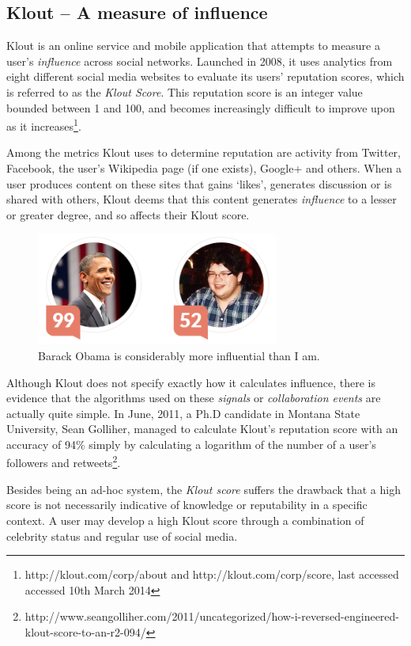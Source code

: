 \documentclass[]{final_report}
\begin{document}
\subsection{Klout -- A measure of influence}

Klout is an online service and mobile application that attempts to measure a user's \textsl{influence} across social networks. Launched in 2008, it uses analytics from eight different social media websites to evaluate its users' reputation scores, which is referred to as the \textsl{Klout Score}. This reputation score is an integer value bounded between 1 and 100, and becomes increasingly difficult to improve upon as it increases\footnote{http://klout.com/corp/about and http://klout.com/corp/score, last accessed accessed 10th March 2014}.

Among the metrics Klout uses to determine reputation are activity from Twitter, Facebook, the user's Wikipedia page (if one exists), Google+ and others. When a user produces content on these sites that gains `likes', generates discussion or is shared with others, Klout deems that this content generates \textsl{influence} to a lesser or greater degree, and so affects their Klout score.

\begin{figure}[ht!]
\centering
\includegraphics[width=80mm]{chap2/klout.png}
\caption{Barack Obama is considerably more influential than I am.}
\end{figure}\label{gra:klout}

Although Klout does not specify exactly how it calculates influence, there is evidence that the algorithms used on these \textsl{signals} or \textsl{collaboration events} are actually quite simple. In June, 2011, a Ph.D candidate in Montana State University, Sean Golliher, managed to calculate Klout's reputation score with an accuracy of 94\% simply by calculating a logarithm of the number of a user's followers and retweets\footnote{http://www.seangolliher.com/2011/uncategorized/how-i-reversed-engineered-klout-score-to-an-r2-094/}.

Besides being an ad-hoc system, the \textsl{Klout score} suffers the drawback that a high score is not necessarily indicative of knowledge or reputability in a specific context. A user may develop a high Klout score through a combination of celebrity status and regular use of social media.
\end{document}
